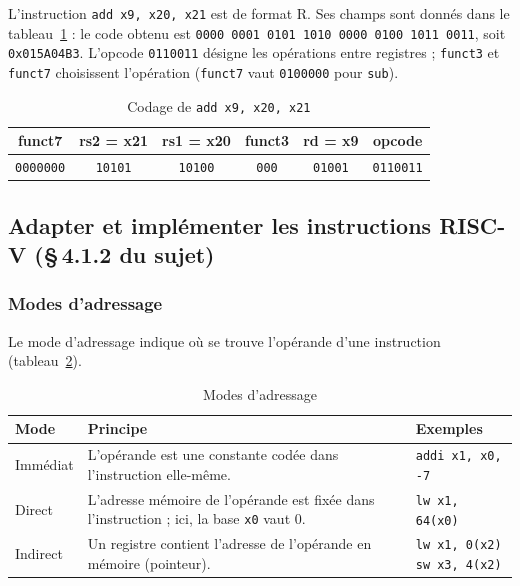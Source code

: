 L'instruction \texttt{add x9, x20, x21} est de format R. Ses champs sont donnés dans le
tableau~\ref{tab:add} : le code obtenu est
\texttt{0000 0001 0101 1010 0000 0100 1011 0011}, soit \texttt{0x015A04B3}. L'opcode
\texttt{0110011} désigne les opérations entre registres ; \texttt{funct3} et \texttt{funct7}
choisissent l'opération (\texttt{funct7} vaut \texttt{0100000} pour \texttt{sub}).

\begin{table}[H]
\centering
\begin{tabular}{|c|c|c|c|c|c|}
\hline
funct7 & rs2 = x21 & rs1 = x20 & funct3 & rd = x9 & opcode \\
\hline
\texttt{0000000} & \texttt{10101} & \texttt{10100} & \texttt{000} & \texttt{01001} & \texttt{0110011} \\
\hline
\end{tabular}
\caption{Codage de \texttt{add x9, x20, x21}}
\label{tab:add}
\end{table}

\subsection{Adapter et implémenter les instructions RISC-V (\S\,4.1.2 du sujet)}
\label{sec:adapter}

\subsubsection{Modes d'adressage}

Le mode d'adressage indique où se trouve l'opérande d'une instruction
(tableau~\ref{tab:adressage}).

\begin{table}[H]
\centering
\begin{tabularx}{\linewidth}{lXl}
\toprule
Mode & Principe & Exemples \\
\midrule
Immédiat & L'opérande est une constante codée dans l'instruction elle-même. & \texttt{addi x1, x0, -7} \\
\addlinespace
Direct & L'adresse mémoire de l'opérande est fixée dans l'instruction ; ici, la base
\texttt{x0} vaut 0. & \texttt{lw x1, 64(x0)} \\
\addlinespace
Indirect & Un registre contient l'adresse de l'opérande en mémoire (pointeur). &
\makecell[tl]{\texttt{lw x1, 0(x2)}\\ \texttt{sw x3, 4(x2)}} \\
\bottomrule
\end{tabularx}
\caption{Modes d'adressage}
\label{tab:adressage}
\end{table}

